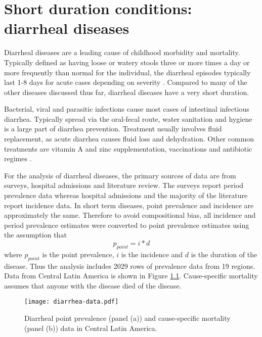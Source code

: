 \chapter{Short duration conditions: diarrheal diseases}
\label{applications-short_dur}

Diarrheal diseases are a leading cause of childhood morbidity and mortality.  Typically defined as having loose or watery stools three or more times a day or more frequently than normal for the individual, the diarrheal episodes typically last 1-8 days for acute cases depending on severity \cite{unicef_diarrhoea_2009, carlos_etiology_1990, lamberti_systematic_2012}.  Compared to many of the other diseases discussed thus far, diarrheal diseases have a very short duration.

Bacterial, viral and parasitic infections cause most cases of intestinal infectious diarrhea.  Typically spread via the oral-fecal route, water sanitation and hygiene is a large part of diarrhea prevention.  Treatment usually involves fluid replacement, as acute diarrhea causes fluid loss and dehydration.  Other common treatments are vitamin A and zinc supplementation, vaccinations and antibiotic regimes \cite{unicef_diarrhoea_2009, carlos_etiology_1990, lamberti_systematic_2012}.

For the analysis of diarrheal diseases, the primary sources of data are from surveys, hospital admissions and literature review.  The surveys report period prevalence data whereas hospital admissions and the majority of the literature report incidence data.  In short term diseases, point prevalence and incidence are approximately the same.  Therefore to avoid compositional bias, all incidence and period prevalence estimates were converted to point prevalence estimates using the assumption that
    \begin{equation}
    	p_{point}=i*d
    \end{equation}
where $p_{point}$ is the point prevalence, $i$ is the incidence and $d$ is the duration of the disease.  Thus the analysis includes 2029 rows of prevalence data from 19 regions.  Data from Central Latin America is shown in Figure \ref{fig:app-diarrhea data}.  Cause-specific mortality assumes that anyone with the disease died of the disease.

    \begin{figure}[h]
        \begin{center}
            \texttt{[image: diarrhea-data.pdf]}
            \caption{Diarrheal point prevalence (panel (a)) and cause-specific mortality (panel (b)) data in Central Latin America.}
            \label{fig:app-diarrhea data}
        \end{center}
    \end{figure}

